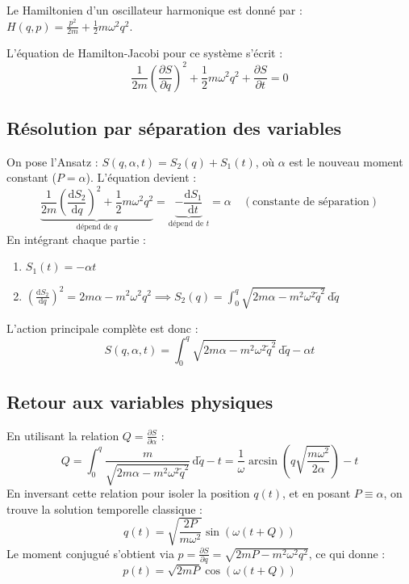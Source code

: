 \documentclass[french]{yLectureNote}
\newcommand{\dd}{\mathrm{d}}
\begin{document}
Le Hamiltonien d'un oscillateur harmonique est donné par : $H(q,p) = \frac{p^2}{2m} + \frac{1}{2}m\omega^2 q^2$.

L'équation de Hamilton-Jacobi pour ce système s'écrit :
\begin{equation}
    \frac{1}{2m}\left(\frac{\partial S}{\partial q}\right)^2 + \frac{1}{2}m\omega^2 q^2 + \frac{\partial S}{\partial t} = 0
\end{equation}

\subsection{Résolution par séparation des variables}
On pose l'Ansatz : $S(q, \alpha, t) = S_2(q) + S_1(t)$, où $\alpha$ est le nouveau moment constant ($P = \alpha$).
L'équation devient :
\begin{equation}
    \underbrace{\frac{1}{2m}\left(\frac{\dd S_2}{\dd q}\right)^2 + \frac{1}{2}m\omega^2 q^2}_{\text{dépend de } q} = \underbrace{-\frac{\dd S_1}{\dd t}}_{\text{dépend de } t} = \alpha \quad (\text{constante de séparation})
\end{equation}
En intégrant chaque partie :
\begin{enumerate}
    \item $S_1(t) = -\alpha t$
    \item $\left(\frac{\dd S_2}{\dd q}\right)^2 = 2m\alpha - m^2\omega^2 q^2 \implies S_2(q) = \int_0^q \sqrt{2m\alpha - m^2\omega^2 \tilde{q}^2} \, \dd\tilde{q}$
\end{enumerate}

L'action principale complète est donc :
\begin{equation}
    S(q, \alpha, t) = \int_0^q \sqrt{2m\alpha - m^2\omega^2 \tilde{q}^2} \, \dd\tilde{q} - \alpha t
\end{equation}

\subsection{Retour aux variables physiques}
En utilisant la relation $Q = \frac{\partial S}{\partial \alpha}$ :
\begin{equation}
    Q = \int_0^q \frac{m}{\sqrt{2m\alpha - m^2\omega^2 \tilde{q}^2}} \, \dd\tilde{q} - t = \frac{1}{\omega} \arcsin\left(q\sqrt{\frac{m\omega^2}{2\alpha}}\right) - t
\end{equation}
En inversant cette relation pour isoler la position $q(t)$, et en posant $P \equiv \alpha$, on trouve la solution temporelle classique :
\begin{equation}
    q(t) = \sqrt{\frac{2P}{m\omega^2}} \sin\left(\omega(t + Q)\right)
\end{equation}
Le moment conjugué s'obtient via $p = \frac{\partial S}{\partial q} = \sqrt{2mP - m^2\omega^2 q^2}$, ce qui donne :
\begin{equation}
    p(t) = \sqrt{2mP} \cos\left(\omega(t + Q)\right)
\end{equation}
\end{document}
